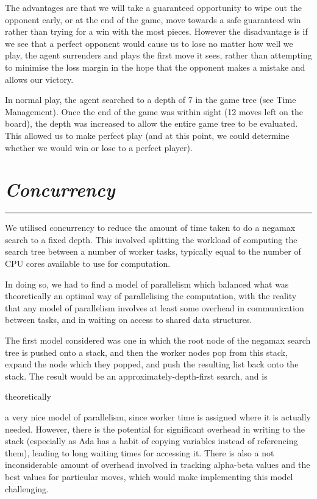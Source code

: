 \documentclass[10pt]{report}
\begin{document}
\begin{multicols}{2}
The advantages are that we will take a guaranteed opportunity to wipe out the opponent early, or at the end of the game, move towards a safe guaranteed win rather than trying for a win with the most pieces. However the disadvantage is if we see that a perfect opponent would cause us to lose no matter how well we play, the agent surrenders and plays the first move it sees, rather than attempting to minimise the loss margin in the hope that the opponent makes a mistake and allows our victory.

In normal play, the agent searched to a depth of 7 in the game tree (see Time Management). Once the end of the game was within sight (12 moves left on the board), the depth was increased to allow the entire game tree to be evaluated. This allowed us to make perfect play (and at this point, we could determine whether we would win or lose to a perfect player).
\section*{\emph{Concurrency}}
\hrule

We utilised concurrency to reduce the amount of time taken to do a negamax search to a fixed depth. This involved splitting the workload of computing the search tree between a number of worker tasks, typically equal to the number of CPU cores available to use for computation.

In doing so, we had to find a model of parallelism which balanced what was theoretically an optimal way of parallelising the computation, with the reality that any model of parallelism involves at least some overhead in communication between tasks, and in waiting on access to shared data structures.

The first model considered was one in which the root node of the negamax search tree is pushed onto a stack, and then the worker nodes pop from this stack, expand the node which they popped, and push the resulting list back onto the stack. The result would be an approximately-depth-first search, and is \begin{em} theoretically \end{em} a very nice model of parallelism, since worker time is assigned where it is actually needed. However, there is the potential for significant overhead in writing to the stack (especially as Ada has a habit of copying variables instead of referencing them), leading to long waiting times for accessing it. There is also a not inconsiderable amount of overhead involved in tracking alpha-beta values and the best values for particular moves, which would make implementing this model challenging.


\end{multicols}
\end{document}
